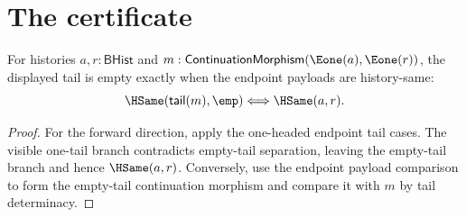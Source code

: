 


\section{The certificate}

\begin{theorem}
\label{thm:continuation-morphism-e1-source-e1-target-tail-empty-iff}
For histories $a,r:\mathsf{BHist}$ and
$m:\mathsf{ContinuationMorphism}(\Eone(a),\Eone(r))$, the displayed tail is
empty exactly when the endpoint payloads are history-same:
$$
\HSame(\mathsf{tail}(m),\emp)\Longleftrightarrow\HSame(a,r).
$$
\end{theorem}
\begin{proof}
For the forward direction, apply the one-headed endpoint tail cases. The
visible one-tail branch contradicts empty-tail separation, leaving the
empty-tail branch and hence $\HSame(a,r)$. Conversely, use the endpoint payload
comparison to form the empty-tail continuation morphism and compare it with
$m$ by tail determinacy.
\end{proof}

